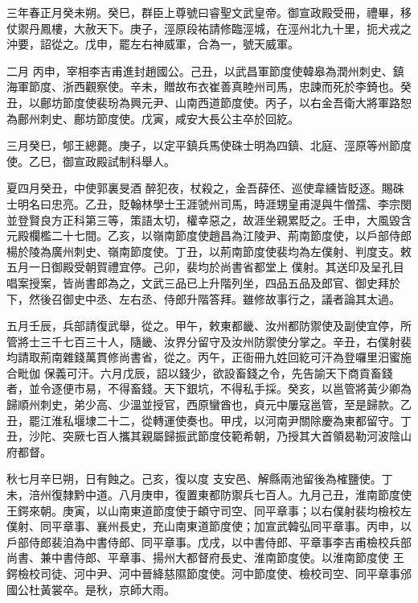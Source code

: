 \begin{pinyinscope}
 三年春正月癸未朔。癸巳，群臣上尊號曰睿聖文武皇帝。御宣政殿受冊，禮畢，移仗禦丹鳳樓，大赦天下。庚子，涇原段祐請修臨涇城，在涇州北九十里，扼犬戎之沖要，詔從之。戊申，罷左右神威軍，合為一，號天威軍。



 二月
 丙申，宰相李吉甫進封趙國公。己丑，以武昌軍節度使韓皋為潤州刺史、鎮海軍節度、浙西觀察使。辛未，贈故布衣崔善真睦州司馬，忠諫而死於李錡也。癸丑，以鄜坊節度使裴玢為興元尹、山南西道節度使。丙子，以右金吾衛大將軍路恕為鄜州刺史、鄜坊節度使。戊寅，咸安大長公主卒於回紇。



 三月癸巳，郇王總薨。庚子，以定平鎮兵馬使硃士明為四鎮、北庭、涇原等州節度使。乙巳，御宣政殿試制科舉人。



 夏四月癸丑，中使郭裏旻酒
 醉犯夜，杖殺之，金吾薛伾、巡使韋纁皆貶逐。賜硃士明名曰忠亮。乙丑，貶翰林學士王涯虢州司馬，時涯甥皇甫湜與牛僧孺、李宗閔並登賢良方正科第三等，策語太切，權幸惡之，故涯坐親累貶之。壬申，大風毀含元殿欄檻二十七間。乙亥，以嶺南節度使趙昌為江陵尹、荊南節度使，以戶部侍郎楊於陵為廣州刺史、嶺南節度使。丁丑，以荊南節度使裴均為左僕射、判度支。敕五月一日御殿受朝賀禮宜停。己卯，裴均於尚書省都堂上
 僕射。其送印及呈孔目唱案授案，皆尚書郎為之，文武三品已上升階列坐，四品五品及郎官、御史拜於下，然後召御史中丞、左右丞、侍郎升階答拜。雖修故事行之，議者論其太過。



 五月壬辰，兵部請復武舉，從之。甲午，敕東都畿、汝州都防禦使及副使宜停，所管將士三千七百三十人，隨畿、汝界分留守及汝州防禦使分掌之。辛丑，右僕射裴均請取荊南雜錢萬貫修尚書省，從之。丙午，正衙冊九姓回紇可汗為登囉里汨蜜施合毗伽
 保義可汗。六月戊辰，詔以錢少，欲設畜錢之令，先告諭天下商貢畜錢者，並令逐便市易，不得畜錢。天下銀坑，不得私手採。癸亥，以邕管將黃少卿為歸順州刺史，弟少高、少溫並授官，西原蠻酋也，貞元中屢寇邕管，至是歸款。乙丑，罷江淮私堰埭二十二，從轉運使奏也。甲戌，以河南尹關除慶為東都留守。丁丑，沙陀、突厥七百人攜其親屬歸振武節度伎範希朝，乃授其大首領曷勒河波陰山府都督。



 秋七月辛巳朔，日有蝕之。己亥，復以度
 支安邑、解縣兩池留後為榷鹽使。丁未，涪州復隸黔中道。八月庚申，復置東都防禦兵七百人。九月己丑，淮南節度使王鍔來朝。庚寅，以山南東道節度使于頔守司空、同平章事；以右僕射裴均檢校左僕射、同平章事、襄州長史，充山南東道節度使；加宣武韓弘同平章事。丙申，以戶部侍郎裴洎為中書侍郎、同平章事。戊戌，以中書侍郎、平章事李吉甫檢校兵部尚書、兼中書侍郎、平章事、揚州大都督府長史、淮南節度使。以淮南節度使
 王鍔檢校司徒、河中尹、河中晉絳慈隰節度使。河中節度使、檢校司空、同平章事邠國公杜黃裳卒。是秋，京師大雨。




\end{pinyinscope}
